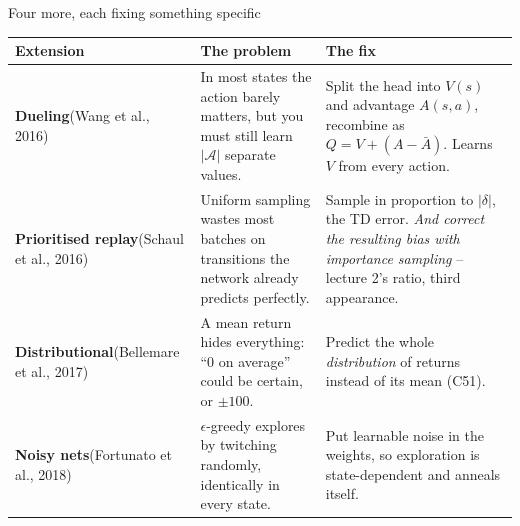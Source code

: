 \documentclass[aspectratio=169]{beamer}
\begin{document}
\begin{frame}{Four more, each fixing something specific}
  \footnotesize
  \begin{center}
  \begin{tabular}{p{2.6cm} p{4.6cm} p{5.4cm}}
    \toprule
    \textbf{Extension} & \textbf{The problem} & \textbf{The fix} \\
    \midrule
    \textbf{Dueling}\newline (Wang et al., 2016) &
      In most states the action barely matters, but you must still learn $|\mathcal{A}|$
      separate values. &
      Split the head into $V(s)$ and advantage $A(s,a)$, recombine as
      $Q = V + (A - \bar{A})$. Learns $V$ from every action. \\[6pt]
    \textbf{Prioritised replay}\newline (Schaul et al., 2016) &
      Uniform sampling wastes most batches on transitions the network already predicts
      perfectly. &
      Sample in proportion to $|\delta|$, the TD error. \emph{And correct the resulting bias with
      importance sampling} -- lecture 2's ratio, third appearance. \\[6pt]
    \textbf{Distributional}\newline (Bellemare et al., 2017) &
      A mean return hides everything: ``$0$ on average'' could be certain, or $\pm 100$. &
      Predict the whole \emph{distribution} of returns instead of its mean (C51). \\[6pt]
    \textbf{Noisy nets}\newline (Fortunato et al., 2018) &
      $\epsilon$-greedy explores by twitching randomly, identically in every state. &
      Put learnable noise in the weights, so exploration is state-dependent and anneals itself. \\
    \bottomrule
  \end{tabular}
  \end{center}
\end{frame}
\end{document}
